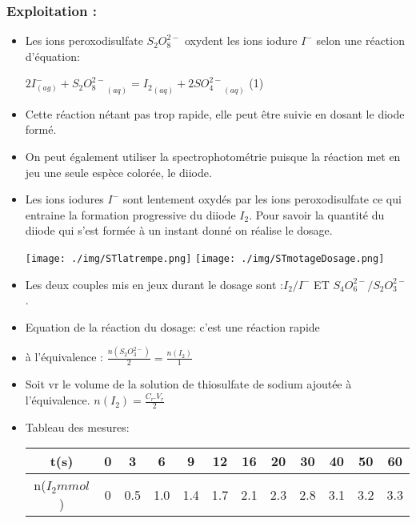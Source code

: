 \documentclass[12pt]{article}
\begin{document}
\subsubsection{Exploitation :}
\begin{itemize}
	\item Les ions peroxodisulfate $S_2O_8^{2-}$ oxydent les ions iodure $I^-$ selon une réaction d'équation:

	      $2I^-_{(ag)} + {S_2O_8^{2-}}_{(aq)} = {I_2}_{(aq)} + 2{SO_4^{2-}}_{(aq)}$ (1)

	\item Cette réaction nétant pas trop rapide, elle peut être suivie en dosant le
	      diode formé.

	\item On peut également utiliser la spectrophotométrie puisque la réaction met en jeu une seule espèce colorée, le diiode.

	\item Les ions iodures $I^-$ sont lentement oxydés par les ions peroxodisulfate ce qui entraine la formation progressive du diiode $I_2$.
	      Pour savoir la quantité du diiode qui s'est formée à un instant donné on réalise le dosage.


	      \begin{center}
		      \texttt{[image: ./img/STlatrempe.png]}
		      \texttt{[image: ./img/STmotageDosage.png]}
	      \end{center}

	\item Les deux couples mis en jeux durant le dosage sont :$I_2/I^-$ ET $S_4O_6^{2-}/S_2O_3^{2-}$.
	\item Equation de la réaction du dosage: 
	      c'est une réaction rapide
	\item à l'équivalence : $\frac{n(S_2O_3^{2-})}{2} = \frac{n(I_2)}{1}$

	\item Soit vr le volume de la solution de thiosulfate de sodium ajoutée à l'équivalence. $n(I_2) = \frac{C_r.V_r}{2}$

	\item Tableau des mesures:

	      \begin{center}
		      \begin{tabular}{|c|c|c|c|c|c|c|c|c|c|c|c|}
			      \hline
			      t(s)          & 0 & 3   & 6   & 9   & 12  & 16  & 20  & 30  & 40  & 50  & 60  \\\hline
			      n($I_2 mmol$) & 0 & 0.5 & 1.0 & 1.4 & 1.7 & 2.1 & 2.3 & 2.8 & 3.1 & 3.2 & 3.3 \\\hline
		      \end{tabular}
	      \end{center}




\end{itemize}
\end{document}
